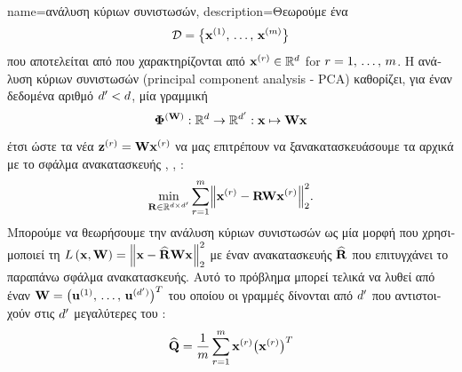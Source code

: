{name={\foreignlanguage{greek}{ανάλυση κύριων συνιστωσών}}, 
	description={\foreignlanguage{greek}{Θεωρούμε ένα}  
		$$\mathcal{D} = \big\{ {\bf x}^{(1)}, \,\ldots, \,{\bf x}^{(m)} \big\}$$
		\foreignlanguage{greek}{που αποτελείται από}  \foreignlanguage{greek}{που χαρακτηρίζονται από} 
		 ${\bf x}^{(r)} \in \mathbb{R}^{d}$ for $r=1,\,\ldots,\,m$.
		\foreignlanguage{greek}{Η ανάλυση κύριων συνιστωσών} 
		(principal component analysis - PCA) \foreignlanguage{greek}{καθορίζει, για έναν δεδομένα αριθμό 
		$d' < d$, μία γραμμική} 
		$${\bf \Phi}^{({\bf W})}: \mathbb{R}^{d} \rightarrow 
		\mathbb{R}^{d'}: {\bf x} \mapsto {\bf W} {\bf x}$$
		\foreignlanguage{greek}{έτσι ώστε τα νέα}  $\mathbf{z}^{(r)} = {\bf W} {\bf x}^{(r)}$
		\foreignlanguage{greek}{να μας επιτρέπουν να ξανακατασκευάσουμε τα αρχικά}  
		\foreignlanguage{greek}{με το}  \foreignlanguage{greek}{σφάλμα ανακατασκευής} 
		\cite{MLBasics}, \cite{BishopBook}, \cite{hastie01statisticallearning}:
		$$\min_{\mR \in \mathbb{R}^{\nrfeatures \times \nrfeatures'}} 
		\sum_{\sampleidx=1}^{\samplesize} 
		\normgeneric{\featurevec^{(\sampleidx)}- \mR \mW \featurevec^{(\sampleidx)}}{2}^{2}.$$ 
		\foreignlanguage{greek}{Μπορούμε να θεωρήσουμε την ανάλυση κύριων συνιστωσών ως μία μορφή}  
		\foreignlanguage{greek}{που χρησιμοποιεί τη}  
		$\lossfunc{\featurevec}{\mW} = \normgeneric{\featurevec- \widehat{\mR} \mW \featurevec}{2}^{2}$ \foreignlanguage{greek}{με έναν}  
		 \foreignlanguage{greek}{ανακατασκευής $\widehat{{\bf R}}$ που επιτυγχάνει το παραπάνω}
		 \foreignlanguage{greek}{σφάλμα ανακατασκευής. Αυτό το πρόβλημα}  
		\foreignlanguage{greek}{μπορεί τελικά να λυθεί από έναν}   
		${\bf W} = \big(\mathbf{u}^{(1)},\,\ldots,\,\mathbf{u}^{(d')}\big)^{T}$ \foreignlanguage{greek}{του οποίου οι γραμμές δίνονται από} 
		$d'$  \foreignlanguage{greek}{που αντιστοιχούν στις $d'$ μεγαλύτερες} 
		 \foreignlanguage{greek}{του} :
		$$\widehat{\mathbf{Q}} = \frac{1}{m} \sum_{r=1}^{m} 
		{\bf x}^{(r)} \big( {\bf x}^{(r)}\big)^{T}
$$}}
